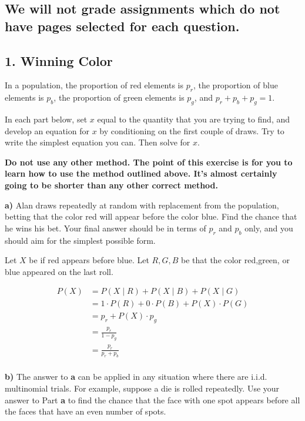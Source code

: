 \documentclass[11pt]{article}
\begin{document}
    \subsection{\texorpdfstring{\textbf{We will not grade assignments which
do not have pages selected for each
question.}}{We will not grade assignments which do not have pages selected for each question.}}\label{we-will-not-grade-assignments-which-do-not-have-pages-selected-for-each-question.}

    \newpage

    \subsection{1. Winning Color}\label{winning-color}

In a population, the proportion of red elements is \(p_r\), the
proportion of blue elements is \(p_b\), the proportion of green elements
is \(p_g\), and \(p_r + p_b + p_g = 1\).

In each part below, set \(x\) equal to the quantity that you are trying
to find, and develop an equation for \(x\) by conditioning on the first
couple of draws. Try to write the simplest equation you can. Then solve
for \(x\).

\textbf{Do not use any other method. The point of this exercise is for
you to learn how to use the method outlined above. It's almost certainly
going to be shorter than any other correct method.}

\textbf{a)} Alan draws repeatedly at random with replacement from the
population, betting that the color red will appear before the color
blue. Find the chance that he wins his bet. Your final answer should be
in terms of \(p_r\) and \(p_b\) only, and you should aim for the
simplest possible form.


Let $ X $ be if red appears before blue. Let $ R,G,B $ be that the color red,green, or blue appeared on the last roll. 

\begin{align*}
	P(X) &= P(X \mid R) + P(X \mid B) + P(X \mid G) \\
	&= 1 \cdot P(R) + 0 \cdot P(B) + P(X)\cdot P(G) \\
	&= p_{r} + P(X) \cdot  p_{g}\\
&=  \frac{p_{r}}{1-p_{g}} \\
&= \frac{p_{r}}{p_{r} + p_{b}} \\
\end{align*}


\textbf{b)} The answer to \textbf{a} can be applied in any situation
where there are i.i.d. multinomial trials. For example, suppose a die is
rolled repeatedly. Use your answer to Part \textbf{a} to find the chance
that the face with one spot appears before all the faces that have an
even number of spots.
\end{document}
